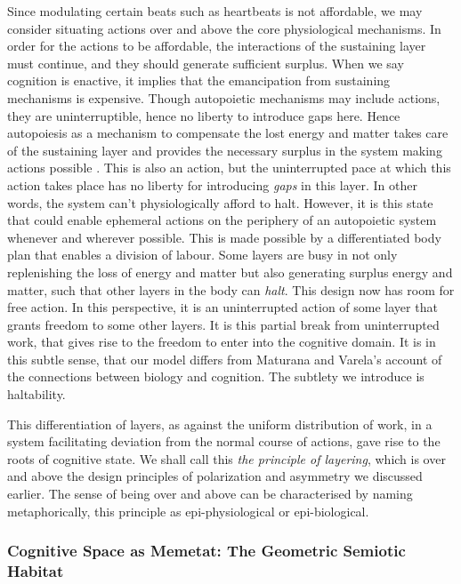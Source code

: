 Since modulating certain beats such as heartbeats is not affordable, we may consider situating actions over and above the core physiological mechanisms. In order for the actions to be affordable, the interactions of the sustaining layer must continue, and they should generate sufficient surplus. When we say cognition is enactive, it implies that the emancipation from sustaining mechanisms is expensive. Though autopoietic mechanisms may include actions, they are uninterruptible, hence no liberty to introduce gaps here. Hence autopoiesis as a mechanism to compensate the lost energy and matter takes care of the sustaining layer and provides the necessary surplus in the system making actions possible \cite{maturana1991autopoiesis}. This is also an action, but the uninterrupted pace at which this action takes place has no liberty for introducing \textit{gaps} in this layer. In other words, the system can't physiologically afford to halt. However, it is this state that could enable ephemeral actions on the periphery of an autopoietic system whenever and wherever possible. This is made possible by a differentiated body plan that enables a division of labour. Some layers are busy in not only replenishing the loss of energy and matter but also generating surplus energy and matter, such that other layers in the body can \textit{halt}. This design now has room for free action. In this perspective, it is an uninterrupted action of some layer that grants freedom to some other layers. It is this partial break from uninterrupted work, that gives rise to the freedom to enter into the cognitive domain. It is in this subtle sense, that our model differs from Maturana and Varela's account of the connections between biology and cognition. The subtlety we introduce is haltability.

This differentiation of layers, as against the uniform distribution of work, in a system facilitating deviation from the normal course of actions, gave rise to the roots of cognitive state. We shall call this \textit{the principle of layering}, which is over and above the design principles of polarization and asymmetry we discussed earlier. The sense of being over and above can be characterised by naming metaphorically, this principle as epi-physiological or epi-biological.

\subsubsection{Cognitive Space as Memetat: The Geometric Semiotic Habitat}
\label{subsec:memetat}

